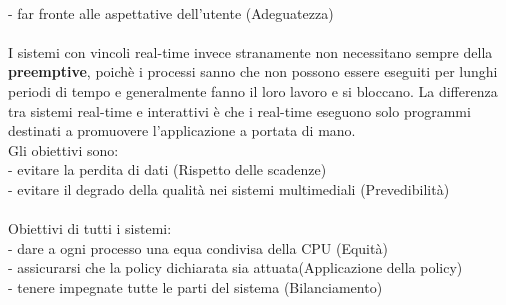\documentclass{article}
\begin{document}
\\- far fronte alle aspettative dell'utente (Adeguatezza)
\\
\\
I sistemi con vincoli real-time invece stranamente non necessitano sempre della \textbf{preemptive}, poichè i processi sanno che non 
possono essere eseguiti per lunghi periodi di tempo e generalmente fanno il loro lavoro e si bloccano. La differenza tra sistemi real-time e interattivi è che 
i real-time eseguono solo programmi destinati a promuovere l'applicazione a portata di mano.
\\Gli obiettivi sono:
\\- evitare la perdita di dati (Rispetto delle scadenze)
\\- evitare il degrado della qualità nei sistemi multimediali (Prevedibilità)
\\
\\
Obiettivi di tutti i sistemi:
\\- dare a ogni processo una equa condivisa della CPU (Equità)
\\- assicurarsi che la policy dichiarata sia attuata(Applicazione della policy)
\\- tenere impegnate tutte le parti del sistema (Bilanciamento)
\end{document}
